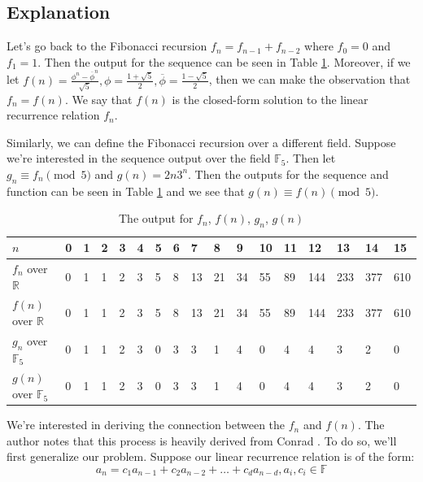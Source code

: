 \documentclass[a4paper]{article}
\theoremstyle{definition}
\begin{document}
\subsection{Explanation}
Let's go back to the Fibonacci recursion $f_n=f_{n-1}+f_{n-2}$ where $f_0=0$ and $f_1=1$. Then the output for the sequence can be seen in Table \ref{tab:fib-output}. Moreover, if we let $f(n)= \frac{\phi^n-\overline{\phi}^n}{\sqrt{5}}, \phi=\frac{1+\sqrt{5}}{2}, \overline{\phi}=\frac{1-\sqrt{5}}{2}$, then we can make the observation that $f_n=f(n)$. We say that $f(n)$ is the closed-form solution to the linear recurrence relation $f_n$. 

Similarly, we can define the Fibonacci recursion over a different field. Suppose we're interested in the sequence output over the field $\mathbb{F}_5$. Then let $g_n \equiv f_n \pmod 5$ and $g(n)=2n3^n$. Then the outputs for the sequence and function can be seen in Table \ref{tab:fib-output} and we see that $g(n) \equiv f(n) \pmod 5$.
\begin{table}[ht]
\centering
\begin{tabular}{|l|l|l|l|l|l|l|l|l|l|l|l|l|l|l|l|l|}
\hline
$n$ & 0 & 1 & 2 & 3 & 4 & 5 & 6 & 7 & 8 & 9 & 10 & 11 & 12 & 13 & 14 & 15 \\ \hline
$f_n$ over $\mathbb{R}$ & 0 & 1 & 1 & 2 & 3 & 5 & 8 & 13 & 21 & 34 & 55 & 89 & 144 & 233 & 377 & 610 \\ \hline
$f(n)$ over $\mathbb{R}$ & 0 & 1 & 1 & 2 & 3 & 5 & 8 & 13 & 21 & 34 & 55 & 89 & 144 & 233 & 377 & 610 \\ \hline
$g_n$ over $\mathbb{F}_5$ & 0 & 1 & 1 & 2 & 3 & 0 & 3 & 3 & 1 & 4 & 0 & 4 & 4 & 3 & 2 & 0 \\ \hline
$g(n)$ over $\mathbb{F}_5$ & 0 & 1 & 1 & 2 & 3 & 0 & 3 & 3 & 1 & 4 & 0 & 4 & 4 & 3 & 2 & 0 \\ \hline
\end{tabular}
\caption{The output for $f_n$, $f(n)$, $g_n$, $g(n)$}
\label{tab:fib-output}
\end{table}

We're interested in deriving the connection between the $f_n$ and $f(n)$. The author notes that this process is heavily derived from Conrad \cite{bib:solve-lin-rec-field}. To do so, we'll first generalize our problem. Suppose our linear recurrence relation is of the form:
\begin{equation}
a_n=c_1a_{n-1}+c_2a_{n-2}+\ldots+c_da_{n-d}, a_i, c_i \in \mathbb{F}
\label{eq:general-linear-recursion}
\end{equation}
\end{document}
